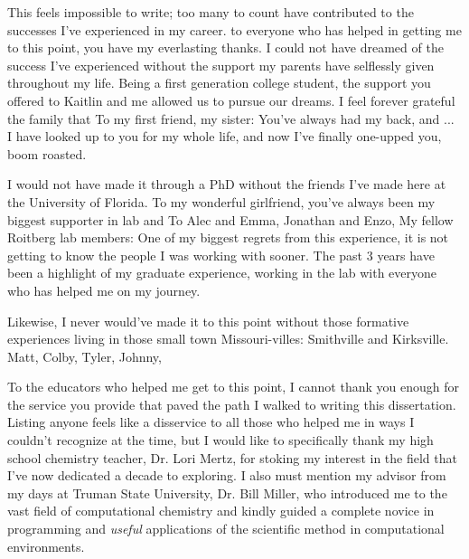 This feels impossible to write; too many to count have contributed to the successes I've experienced in my career. to everyone who has helped in getting me to this point, you have my everlasting thanks. 
I could not have dreamed of the success I've experienced without the support my parents have selflessly given throughout my life. Being a first generation college student, the support you offered to Kaitlin and me allowed us to pursue our dreams. I feel forever grateful the family that 
To my first friend, my sister: You've always had my back, and ... 
I have looked up to you for my whole life, and now I've finally one-upped you, boom roasted.

I would not have made it through a PhD without the friends I've made here at the University of Florida. 
To my wonderful girlfriend, you've always been my biggest supporter in lab and 
To Alec and Emma, Jonathan and Enzo, 
My fellow Roitberg lab members: One of my biggest regrets from this experience, it is not getting to know the people I was working with sooner. The past 3 years have been a highlight of my graduate experience, working in the lab with everyone who has helped me on my journey.

Likewise, I never would've made it to this point without those formative experiences living in those small town Missouri-villes: Smithville and Kirksville. 
Matt, Colby, Tyler, Johnny, 

To the educators who helped me get to this point, I cannot thank you enough for the service you provide that paved the path I walked to writing this dissertation. 
Listing anyone feels like a disservice to all those who helped me in ways I couldn't recognize at the time, but I would like to specifically thank my high school chemistry teacher, Dr. Lori Mertz, for stoking my interest in the field that I've now dedicated a decade to exploring. 
I also must mention my advisor from my days at Truman State University, Dr. Bill Miller, who introduced me to the vast field of computational chemistry and kindly guided a complete novice in programming and \textit{useful} applications of the scientific method in computational environments.
